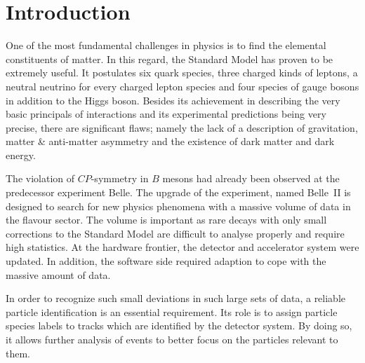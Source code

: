 \chapter{Introduction}
\label{chap:introduction}

One of the most fundamental challenges in physics is to find the elemental constituents of matter. In this regard, the Standard Model has proven to be extremely useful. It postulates six quark species, three charged kinds of leptons, a neutral neutrino for every charged lepton species and four species of gauge bosons in addition to the Higgs boson. Besides its achievement in describing the very basic principals of interactions and its experimental predictions being very precise, there are significant flaws; namely the lack of a description of gravitation, matter \& anti-matter asymmetry and the existence of dark matter and dark energy.

The violation of $CP$-symmetry in $B$ mesons had already been observed at the predecessor experiment Belle. The upgrade of the experiment, named Belle~\RN{2} is designed to search for new physics phenomena with a massive volume of data in the flavour sector. The volume is important as rare decays with only small corrections to the Standard Model are difficult to analyse properly and require high statistics. At the hardware frontier, the detector and accelerator system were updated. In addition, the software side required adaption to cope with the massive amount of data.

In order to recognize such small deviations in such large sets of data, a reliable particle identification is an essential requirement. Its role is to assign particle species labels to tracks which are identified by the detector system. By doing so, it allows further analysis of events to better focus on the particles relevant to them.
